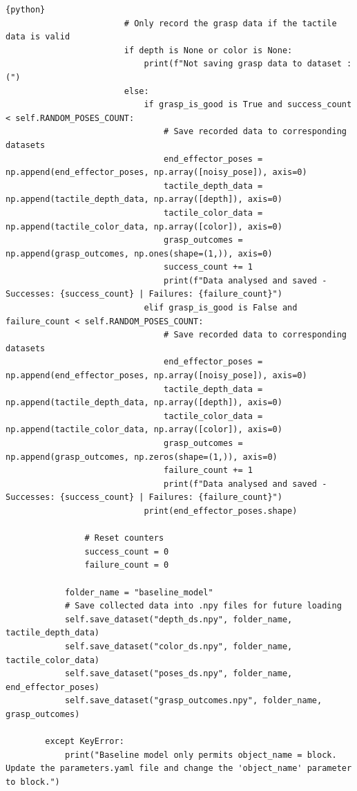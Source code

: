 \documentclass[11pt, a4paper]{report}
\begin{document}
\begin{lstlisting}{python}
                        # Only record the grasp data if the tactile data is valid
                        if depth is None or color is None:
                            print(f"Not saving grasp data to dataset :(")
                        else:
                            if grasp_is_good is True and success_count < self.RANDOM_POSES_COUNT:
                                # Save recorded data to corresponding datasets
                                end_effector_poses = np.append(end_effector_poses, np.array([noisy_pose]), axis=0)
                                tactile_depth_data = np.append(tactile_depth_data, np.array([depth]), axis=0)
                                tactile_color_data = np.append(tactile_color_data, np.array([color]), axis=0)
                                grasp_outcomes = np.append(grasp_outcomes, np.ones(shape=(1,)), axis=0)
                                success_count += 1
                                print(f"Data analysed and saved - Successes: {success_count} | Failures: {failure_count}")
                            elif grasp_is_good is False and failure_count < self.RANDOM_POSES_COUNT:
                                # Save recorded data to corresponding datasets
                                end_effector_poses = np.append(end_effector_poses, np.array([noisy_pose]), axis=0)
                                tactile_depth_data = np.append(tactile_depth_data, np.array([depth]), axis=0)
                                tactile_color_data = np.append(tactile_color_data, np.array([color]), axis=0)
                                grasp_outcomes = np.append(grasp_outcomes, np.zeros(shape=(1,)), axis=0)
                                failure_count += 1
                                print(f"Data analysed and saved - Successes: {success_count} | Failures: {failure_count}")
                            print(end_effector_poses.shape)

                # Reset counters
                success_count = 0
                failure_count = 0

            folder_name = "baseline_model"
            # Save collected data into .npy files for future loading
            self.save_dataset("depth_ds.npy", folder_name, tactile_depth_data)
            self.save_dataset("color_ds.npy", folder_name, tactile_color_data)
            self.save_dataset("poses_ds.npy", folder_name, end_effector_poses)
            self.save_dataset("grasp_outcomes.npy", folder_name, grasp_outcomes)

        except KeyError:
            print("Baseline model only permits object_name = block. Update the parameters.yaml file and change the 'object_name' parameter to block.")


\end{lstlisting}
\end{document}
